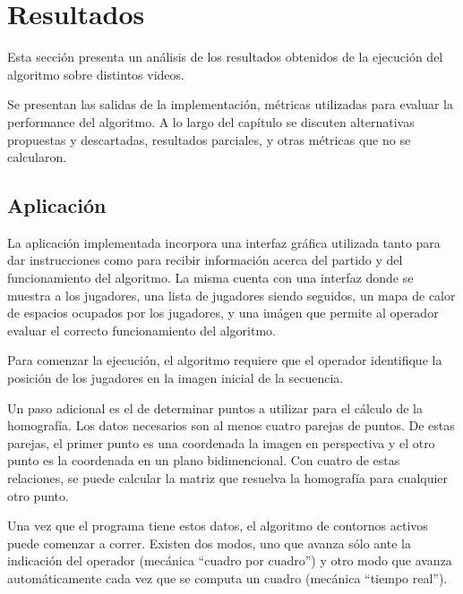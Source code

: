 \section{Resultados}
\label{sec:resultados}

Esta sección presenta un análisis de los resultados obtenidos de la ejecución
del algoritmo sobre distintos videos. %

Se presentan las salidas de la implementación, métricas utilizadas para evaluar la performance del algoritmo. A lo largo del capítulo se discuten alternativas propuestas y descartadas, resultados parciales, y otras métricas que no se calcularon.

\subsection{Aplicación}

La aplicación implementada incorpora una interfaz gráfica utilizada tanto para dar instrucciones como para recibir información acerca del partido y del funcionamiento del algoritmo. La misma cuenta con una interfaz donde se muestra a los jugadores, una lista de jugadores siendo seguidos, un mapa de calor de espacios ocupados por los jugadores, y una imágen que permite al operador evaluar el correcto funcionamiento del algoritmo.

Para comenzar la ejecución, el algoritmo requiere que el operador identifique la posición de los jugadores en la imagen inicial de la secuencia. %

Un paso adicional es el de determinar puntos a utilizar para el cálculo de la homografía. Los datos necesarios son al menos cuatro parejas de puntos. De estas parejas, el primer punto es una coordenada la imagen en perspectiva y el otro punto es la coordenada
en un plano bidimencional. Con cuatro de estas relaciones, se puede calcular la matriz que resuelva la homografía para cualquier otro punto. %

Una vez que el programa tiene estos datos, el algoritmo de contornos activos puede comenzar a correr. Existen dos modos, uno que avanza sólo ante la indicación del operador (mecánica ``cuadro por cuadro'') y otro modo que avanza automáticamente cada vez que se computa un cuadro (mecánica ``tiempo real''). %

